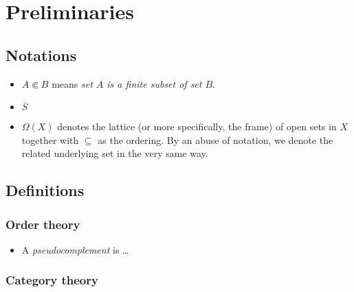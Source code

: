 \chapter*{Preliminaries}

\section*{Notations}

\begin{itemize}
\item $A \Subset B$ means {\sl set $A$ is a finite subset of set $B$\/}.
\item $\overline{S}$ 
\item $\Omega(X)$ denotes the lattice (or more specifically, the frame) of open
sets in $X$ together with $\subseteq$ as the ordering. 
By an abuse of notation, we denote the related underlying set in the very same
way.
\end{itemize}

\section*{Definitions}

\subsection*{Order theory}

\begin{itemize}
\item A \emph{pseudocomplement} is \ldots
\end{itemize}

\subsection*{Category theory}

